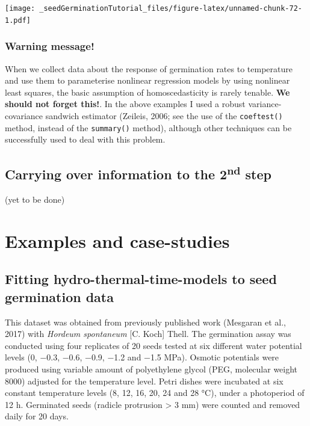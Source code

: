 \documentclass[
]{book}
\begin{document}
\texttt{[image: \_seedGerminationTutorial\_files/figure-latex/unnamed-chunk-72-1.pdf]}

\hypertarget{warning-message}{%
\subsection{Warning message!}\label{warning-message}}

When we collect data about the response of germination rates to temperature and use them to parameterise nonlinear regression models by using nonlinear least squares, the basic assumption of homoscedasticity is rarely tenable. \textbf{We should not forget this!}. In the above examples I used a robust variance-covariance sandwich estimator (Zeileis, 2006; see the use of the \texttt{coeftest()} method, instead of the \texttt{summary()} method), although other techniques can be successfully used to deal with this problem.

\hypertarget{carrying-over-information-to-the-2nd-step}{%
\section{\texorpdfstring{Carrying over information to the 2\textsuperscript{nd} step}{Carrying over information to the 2nd step}}\label{carrying-over-information-to-the-2nd-step}}

(yet to be done)

\hypertarget{examples-and-case-studies}{%
\chapter{Examples and case-studies}\label{examples-and-case-studies}}

\hypertarget{fitting-hydro-thermal-time-models-to-seed-germination-data}{%
\section{Fitting hydro-thermal-time-models to seed germination data}\label{fitting-hydro-thermal-time-models-to-seed-germination-data}}

This dataset was obtained from previously published work (Mesgaran et al., 2017) with \emph{Hordeum spontaneum} {[}C. Koch{]} Thell. The germination assay was conducted using four replicates of 20 seeds tested at six different water potential levels (0, −0.3, −0.6, −0.9, −1.2 and −1.5 MPa). Osmotic potentials were produced using variable amount of polyethylene glycol (PEG, molecular weight 8000) adjusted for the temperature level. Petri dishes were incubated at six constant temperature levels (8, 12, 16, 20, 24 and 28 °C), under a photoperiod of 12 h. Germinated seeds (radicle protrusion \textgreater{} 3 mm) were counted and removed daily for 20 days.
\end{document}
